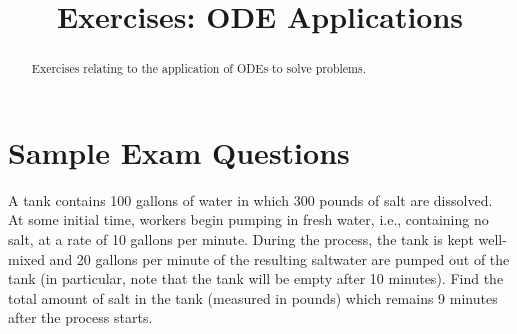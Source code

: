 \documentclass{ximera}
\title{Exercises: ODE Applications}
\begin{document}
\begin{abstract}
Exercises relating to the application of ODEs to solve problems.
\end{abstract}
\maketitle

\section*{Sample Exam Questions}

\begin{question}%

A tank contains 100 gallons of water in which 300 pounds of salt are dissolved. At some initial time, workers begin pumping in fresh water, i.e., containing no salt, at a rate of 10 gallons per minute. During the process, the tank is kept well-mixed and 20 gallons per minute of the resulting saltwater are pumped out of the tank (in particular, note that the tank will be empty after 10 minutes). Find the total amount of salt in the tank (measured in pounds) which remains 9 minutes after the process starts.
\begin{multiplechoice}
\end{multiplechoice}

\end{question}
\end{document}
